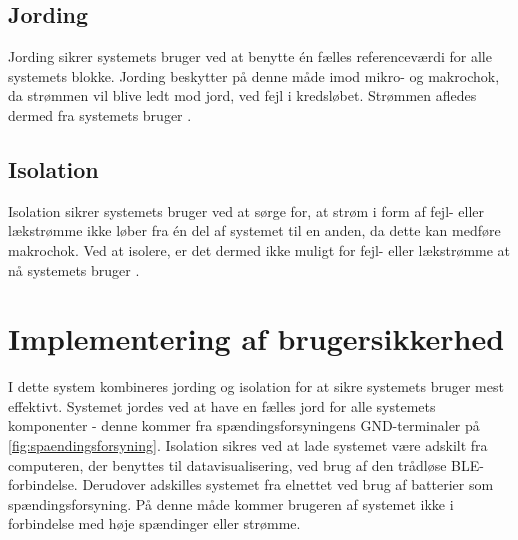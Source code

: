\subsection{Jording}
Jording sikrer systemets bruger ved at benytte én fælles referenceværdi for alle systemets blokke. Jording beskytter på denne måde imod mikro- og makrochok, da strømmen vil blive ledt mod jord, ved fejl i kredsløbet. Strømmen afledes dermed fra systemets bruger \citep{webster1998}.

\subsection{Isolation}
Isolation sikrer systemets bruger ved at sørge for, at strøm i form af fejl- eller lækstrømme ikke løber fra én del af systemet til en anden, da dette kan medføre makrochok. Ved at isolere, er det dermed ikke muligt for fejl- eller lækstrømme at nå systemets bruger \citep{webster1998}. 

\section{Implementering af brugersikkerhed}
I dette system kombineres jording og isolation for at sikre systemets bruger mest effektivt. Systemet jordes ved at have en fælles jord for alle systemets komponenter - denne kommer fra spændingsforsyningens GND-terminaler på \autoref{fig:spaendingsforsyning}. Isolation sikres ved at lade systemet være adskilt fra computeren, der benyttes til datavisualisering, ved brug af den trådløse BLE-forbindelse. Derudover adskilles systemet fra elnettet ved brug af batterier som spændingsforsyning. På denne måde kommer brugeren af systemet ikke i forbindelse med høje spændinger eller strømme. 

